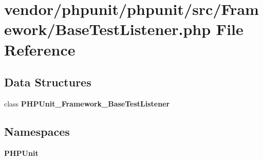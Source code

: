 \section{vendor/phpunit/phpunit/src/\+Framework/\+Base\+Test\+Listener.php File Reference}
\label{_base_test_listener_8php}
\subsection*{Data Structures}
\begin{DoxyCompactItemize}
\item 
class {\bf P\+H\+P\+Unit\+\_\+\+Framework\+\_\+\+Base\+Test\+Listener}
\end{DoxyCompactItemize}
\subsection*{Namespaces}
\begin{DoxyCompactItemize}
\item 
 {\bf P\+H\+P\+Unit}
\end{DoxyCompactItemize}

